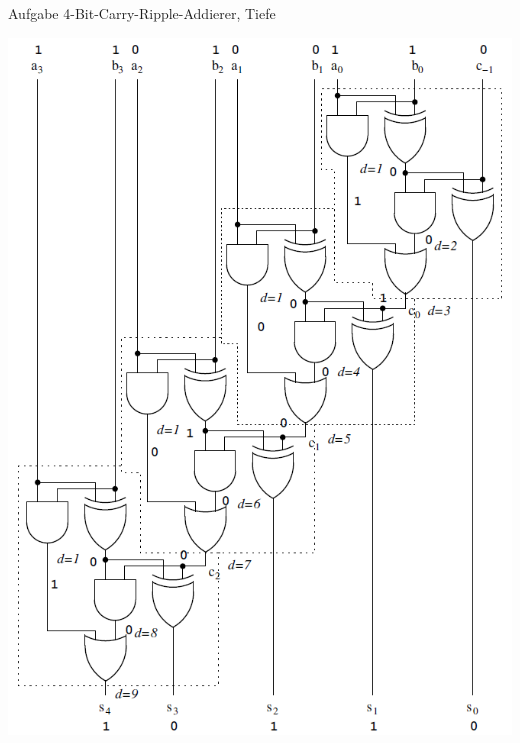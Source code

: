\begin{frame}[allowframebreaks]{Aufgabe \thesection}{4-Bit-Carry-Ripple-Addierer, Tiefe}
\begin{solution}
    \includegraphics[height=0.5\paperheight, center]{content/CRA-Simulation.png}
\end{solution}

\end{frame}